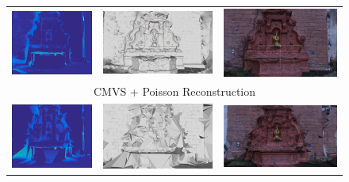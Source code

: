 \begin{figure}[t]
\setlength{\tabcolsep}{1px}
\centering
\begin{tabular}{ccc}
\includegraphics[width=0.32\columnwidth,height=0.25\columnwidth]{./img/errorPoisson}&
\includegraphics[width=0.32\columnwidth,height=0.25\columnwidth]{./img/poissonUntex}&
\includegraphics[width=0.32\columnwidth,height=0.25\columnwidth]{./img/poissonTex}\\
\multicolumn{3}{c}{CMVS + Poisson Reconstruction}\\
\includegraphics[width=0.32\columnwidth,height=0.25\columnwidth]{./img/errorMyFountainInit}&
\includegraphics[width=0.32\columnwidth,height=0.25\columnwidth]{./img/firstUntex}&
\includegraphics[width=0.32\columnwidth,height=0.25\columnwidth]{./img/first_tex}\\

\end{tabular}
\end{figure}
